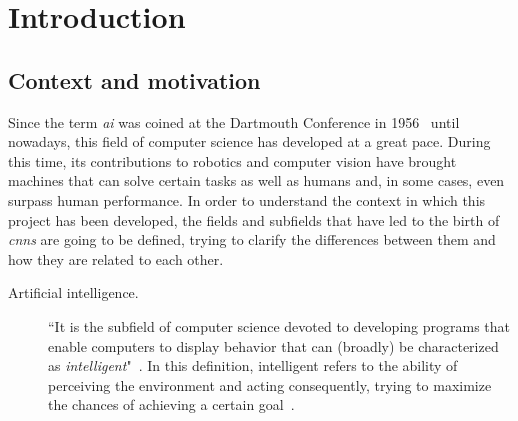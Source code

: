 \chapter{Introduction}\label{ch:introduction}
\section{Context and motivation}
Since the term \emph{\gls{ai}} was coined at the Dartmouth Conference in 1956~\cite{mccarthy2006proposal} until nowadays, this field of computer science has developed at a great pace. During this time, its contributions to robotics and computer vision have brought machines that can solve certain tasks as well as humans and, in some cases, even surpass human performance. In order to understand the context in which this project has been developed, the fields and subfields that have led to the birth of \emph{\glspl{cnn}} are going to be defined, trying to clarify the differences between them and how they are related to each other. 
\begin{description}
	\item[Artificial intelligence.] ``It is the subfield of computer science devoted to developing programs that enable computers to display behavior that can (broadly) be characterized as \emph{intelligent}"~\cite{sep-logic-ai}. In this definition, intelligent refers to the ability of perceiving the environment and acting consequently, trying to maximize the chances of achieving a certain goal~\cite{Russell:2003:AIM:773294}.
\end{description}
